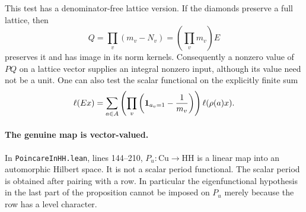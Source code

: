 This test has a denominator-free lattice version.  If the diamonds
preserve a full lattice, then
\[
 Q=\prod_v(m_v-N_v)=\left(\prod_v m_v\right)E
\]
preserves it and has image in its norm kernels.  Consequently a
nonzero value of $PQ$ on a lattice vector supplies an integral
nonzero input, although its value need not be a unit.  One can also
test the scalar functional on the explicitly finite sum
\begin{equation}
 \ell(E x)=\sum_{a\in A}
 \left(\prod_v\left({\bf1}_{a_v=1}-\frac1{m_v}\right)\right)
 \ell(\rho(a)x).
 \label{eq:diamond-finite-test}
\end{equation}

\paragraph{The genuine map is vector-valued.}
In \texttt{PoincareInHH.lean}, lines 144--210,
$P_u:\mathrm{Cu}\to\mathrm{HH}$ is a linear map into an automorphic
Hilbert space.  It is not a scalar period functional.  The scalar
period is obtained after pairing with a row.  In particular the
eigenfunctional hypothesis in the last part of the proposition
cannot be imposed on $P_u$ merely because the row has a level character.

